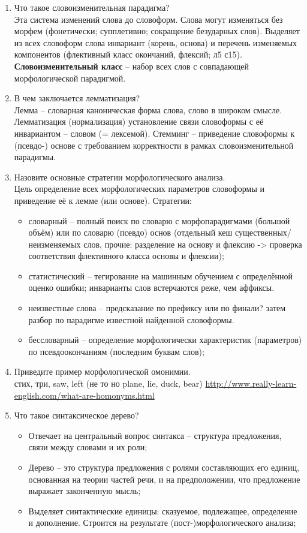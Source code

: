 \documentclass[a4paper]{article}
\begin{document}
\begin{enumerate}
	\item Что такое словоизменительная парадигма?\hfill\\
	Эта система изменений слова до словоформ. Слова могут изменяться без морфем (фонетически; супплетивно; сокращение безударных слов). Выделяет из всех словоформ слова инвариант (корень, основа) и перечень изменяемых компонентов (флективный класс окончаний, флексий; л5 с15). \textbf{Словоизменительный класс} -- набор всех слов с совпадающей морфологической парадигмой.

	\item В чем заключается лемматизация?\hfill\\
	Лемма -- словарная каноническая форма слова, слово в широком смысле. Лемматизация (нормализация) установление связи словоформы с её инвариантом -- словом (= лексемой). Стемминг -- приведение словоформы к (псевдо-) основе с требованием корректности в рамках словоизменительной парадигмы.

	\item Назовите основные стратегии морфологического анализа.\hfill\\
	Цель определение всех морфологических параметров словоформы и приведение её к лемме (или основе).
	Стратегии: \begin{itemize}
		\item словарный -- полный поиск по словарю с морфопарадигмами (большой объём) или по словарю (псевдо) основ (отдельный кеш существенных/неизменяемых слов, прочие: разделение на основу и флексию -> проверка соответствия флективного класса основы и флексии);
		\item статистический -- тегирование на машинным обучением с определённой оценко ошибки; инварианты слов встерчаются реже, чем аффиксы.
		\item неизвестные слова -- предсказание по префиксу или по финали? затем разбор по парадигме известной найденной словоформы.
		\item бессловарный -- определение морфологически характеристик (параметров) по псевдоокончаниям (последним буквам слов);
	\end{itemize}

	\item Приведите пример морфологической омонимии.\hfill\\
		стих, три, saw, left (не то но plane, lie, duck, bear)
		\url{http://www.really-learn-english.com/what-are-homonyms.html}

	\item Что такое синтаксическое дерево?\hfill\\ \begin{itemize}
		\item Отвечает на центральный вопрос синтакса -- структура предложения, связи между словами и их роли;
		\item Дерево -- это структура предложения с ролями составляющих его единиц, основанная на теории частей речи, и на предположении, что предложение выражает законченную мысль;
		\item Выделяет синтактические единицы: сказуемое, подлежащее, определение и дополнение. Строится на результате (пост-)морфологического анализа;
	\end{itemize}


\end{enumerate}
\end{document}
